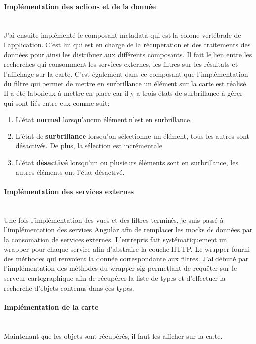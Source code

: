 \documentclass{rapportUHA40}
\begin{document}
\paragraph{Implémentation des actions et de la donnée}\mbox{}\\
J'ai ensuite implémenté le composant metadata qui est la colone vertébrale de
l'application. C'est lui qui est en charge de la récupération et des
traitements des données pour ainsi les distribuer aux différents composants. Il
fait le lien entre les recherches qui consomment les services externes, les
filtres sur les résultats et l'affichage sur la carte. C'est également dans ce
composant que l'implémentation du filtre  \fg{} qui permet de mettre en
surbrillance un élément sur la carte est réalisé. Il a été laborieux à mettre
en place car il y a trois états de surbrillance à gérer qui sont liés entre eux
comme suit:

\begin{enumerate}
  \item L'état \textbf{normal} lorsqu'aucun élément n'est en surbrillance.
  \item L'état de \textbf{surbrillance} lorsqu'on sélectionne un élément, tous les
        autres sont désactivés. De plus, la sélection est incrémentale
  \item L'état \textbf{désactivé} lorsqu'un ou plusieurs éléments sont en surbrillance,
        les autres éléments ont l'état désactivé.
\end{enumerate}

\paragraph{Implémentation des services externes}\mbox{}\\
Une fois l'implémentation des vues et des filtres terminés, je suis passé à
l'implémentation des services Angular afin de remplacer les mocks de données
par la consomation de services externes. L'entrepris fait systématiquement un
\gls{wrapper} pour chaque service afin d'abstraire la couche HTTP\@. Le wrapper
fourni des méthodes qui renvoient la donnée correspondante aux filtres. J'ai
débuté par l'implémentation des méthodes du \gls{wrapper} \gls{sig} permettant
de requêter sur le serveur cartographique afin de récupérer la liste de types
et d'effectuer la recherche d'objets contenus dans ces types. \\

\paragraph{Implémentation de la carte}\mbox{}\\
Maintenant que les objets sont récupérés, il faut les afficher sur la carte.
\end{document}
